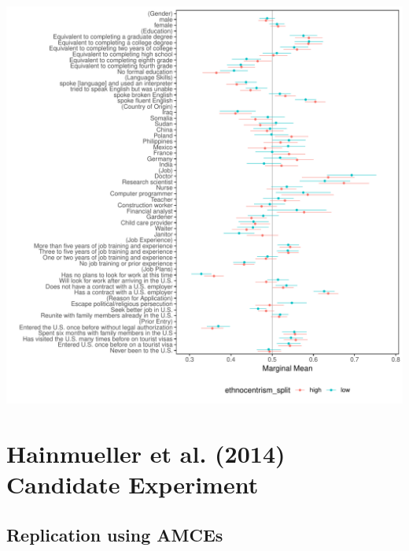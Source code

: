 \documentclass[a4paper,12pt]{article}\usepackage[]{graphicx}\usepackage[]{color}
\makeatletter
\def\maxwidth{ %
  \ifdim\Gin@nat@width>\linewidth
    \linewidth
  \else
    \Gin@nat@width
  \fi
}
\newenvironment{knitrout}{}{} %
\makeatother
\begin{document}
\begin{knitrout}
\color{fgcolor}
\includegraphics[width=\maxwidth]{figure/hainmueller_immigration_subgroup_mm_appendix-1} 

\end{knitrout}

\clearpage

\section{Hainmueller et al. (2014) Candidate Experiment}

\subsection{Replication using AMCEs}
\end{document}
